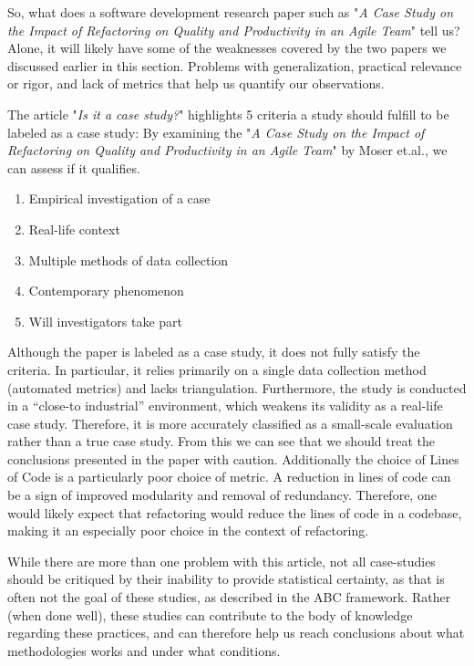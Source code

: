So, what does a software development research paper such as "\textit{A Case Study on the Impact of Refactoring
on Quality and Productivity in an Agile Team}"\cite{Impact_of_Refactoring} tell us?
Alone, it will likely have some of the weaknesses covered by the two papers we
discussed earlier in this section.
Problems with generalization, practical relevance or rigor, and lack of metrics that help us quantify our observations.

The article "\textit{Is it a case study?}"\cite{Is_it_a_case_study} highlights 5 criteria a
study should fulfill to be labeled as a case study: By examining the "\textit{A Case Study on the Impact of Refactoring
on Quality and Productivity in an Agile Team}"\cite{Impact_of_Refactoring} by Moser et.al., we can assess if it qualifies. 
\begin{enumerate}
    \item Empirical investigation of a case
    \item Real-life context
    \item Multiple methods of data collection
    \item Contemporary phenomenon
    \item Will investigators take part
\end{enumerate}

Although the paper is labeled as a case study, it does not fully satisfy the criteria.
In particular, it relies primarily on a single data collection method (automated metrics) and lacks triangulation.
Furthermore, the study is conducted in a “close-to industrial” environment, which weakens its validity as a real-life case study.
Therefore, it is more accurately classified as a small-scale evaluation rather than a true case study.
From this we can see that we should treat the conclusions presented in the paper with caution.
Additionally the choice of Lines of Code is a particularly poor choice of metric.
A reduction in lines of code can be a sign of improved modularity and removal of redundancy.
Therefore, one would likely expect that refactoring would reduce the lines of code in a codebase,
making it an especially poor choice in the context of refactoring.

While there are more than one problem with this article, not all case-studies should be critiqued
by their inability to provide statistical certainty, as that is often not the goal of these studies,
as described in the ABC framework\cite{ABC}.
Rather (when done well), these studies can contribute to the body of knowledge regarding these practices,
and can therefore help us reach conclusions about what methodologies works and under what conditions.

